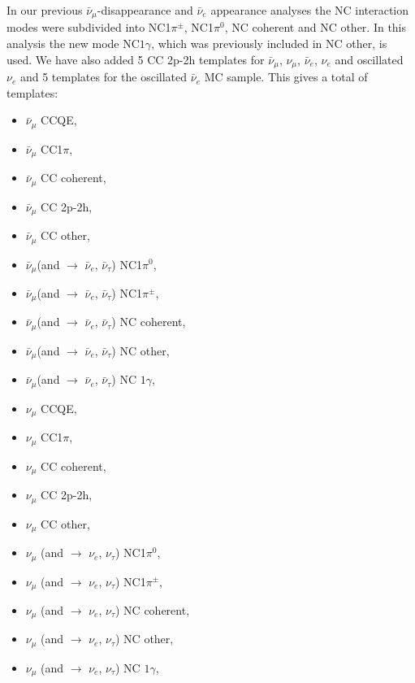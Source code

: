 In our previous $\bar{\nu}_{\mu}$-disappearance and $\bar{\nu}_e$ appearance analyses
the NC interaction modes were subdivided into 
NC1$\pi^{\pm}$, NC1$\pi^{0}$, NC coherent and NC other. 
In this analysis the new mode NC$1\gamma$, which was previously included in NC other, is used.
We have also added 5 CC 2p-2h templates for $\bar{\nu}_{\mu}$, $\nu_{\mu}$, $\bar{\nu}_{e}$, 
$\nu_{e}$ and oscillated $\nu_{e}$ and 5 templates for the oscillated $\bar{\nu}_{e}$ MC sample. This gives a 
total of \NMCTemplate{} templates: 
\begin{itemize}
\item  $\bar{\nu}_{\mu}$ CCQE,
\item  $\bar{\nu}_{\mu}$ CC1$\pi$,
\item  $\bar{\nu}_{\mu}$ CC coherent,
\item  $\bar{\nu}_{\mu}$ CC 2p-2h,
\item  $\bar{\nu}_{\mu}$ CC other,
\item  $\bar{\nu}_{\mu}$(and $\rightarrow$ $\bar{\nu}_{e}$, $\bar{\nu}_{\tau}$) NC1$\pi^{0}$,
\item  $\bar{\nu}_{\mu}$(and $\rightarrow$ $\bar{\nu}_{e}$, $\bar{\nu}_{\tau}$) NC1$\pi^{\pm}$,
\item  $\bar{\nu}_{\mu}$(and $\rightarrow$ $\bar{\nu}_{e}$, $\bar{\nu}_{\tau}$) NC coherent,
\item  $\bar{\nu}_{\mu}$(and $\rightarrow$ $\bar{\nu}_{e}$, $\bar{\nu}_{\tau}$) NC other,
\item  $\bar{\nu}_{\mu}$(and $\rightarrow$ $\bar{\nu}_{e}$, $\bar{\nu}_{\tau}$) NC $1\gamma$,

\item  $\nu_{\mu}$ CCQE,
\item  $\nu_{\mu}$ CC1$\pi$, 
\item  $\nu_{\mu}$ CC coherent, 
\item  $\nu_{\mu}$ CC 2p-2h,
\item  $\nu_{\mu}$ CC other, 
\item  $\nu_{\mu}$ (and $\rightarrow$ $\nu_{e}$, $\nu_{\tau}$) NC1$\pi^{0}$,
\item  $\nu_{\mu}$ (and $\rightarrow$ $\nu_{e}$, $\nu_{\tau}$) NC1$\pi^{\pm}$, 
\item  $\nu_{\mu}$ (and $\rightarrow$ $\nu_{e}$, $\nu_{\tau}$) NC coherent,
\item  $\nu_{\mu}$ (and $\rightarrow$ $\nu_{e}$, $\nu_{\tau}$) NC other, 
\item  $\nu_{\mu}$ (and $\rightarrow$ $\nu_{e}$, $\nu_{\tau}$) NC $1\gamma$, 


\end{itemize}
